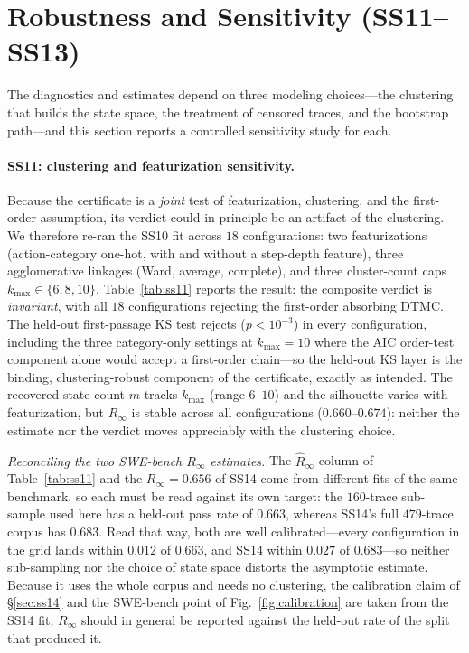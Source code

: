 \section{Robustness and Sensitivity (SS11--SS13)}
\label{sec:robustness}

The diagnostics and estimates depend on three modeling choices---the
clustering that builds the state space, the treatment of censored traces, and
the bootstrap path---and this section reports a controlled sensitivity study
for each.

\paragraph{SS11: clustering and featurization sensitivity.}
Because the certificate is a \emph{joint} test of featurization, clustering,
and the first-order assumption, its verdict could in principle be an artifact
of the clustering. We therefore re-ran the SS10 fit across $18$
configurations: two featurizations (action-category one-hot, with and without
a step-depth feature), three agglomerative linkages (Ward, average, complete),
and three cluster-count caps $k_{\max}\in\{6,8,10\}$. Table~\ref{tab:ss11}
reports the result: the composite verdict is \emph{invariant}, with all $18$
configurations rejecting the first-order absorbing DTMC. The held-out
first-passage KS test rejects ($p<10^{-3}$) in every configuration, including
the three category-only settings at $k_{\max}{=}10$ where the AIC order-test
component alone would accept a first-order chain---so the held-out KS layer is
the binding, clustering-robust component of the certificate, exactly as
intended. The recovered state count $m$ tracks $k_{\max}$ (range $6$--$10$) and
the silhouette varies with featurization, but $\hat R_\infty$ is stable across
all configurations ($0.660$--$0.674$): neither the estimate nor the verdict
moves appreciably with the clustering choice.

\emph{Reconciling the two SWE-bench $R_\infty$ estimates.} The
$\hat R_\infty$ column of Table~\ref{tab:ss11} and the $R_\infty=0.656$ of
SS14 come from different fits of the same benchmark, so each must be read
against its own target: the $160$-trace sub-sample used here has a held-out
pass rate of $0.663$, whereas SS14's full $479$-trace corpus has $0.683$. Read
that way, both are well calibrated---every configuration in the grid lands
within $0.012$ of $0.663$, and SS14 within $0.027$ of $0.683$---so neither
sub-sampling nor the choice of state space distorts the asymptotic estimate.
Because it uses the whole corpus and needs no clustering, the calibration claim
of \S\ref{sec:ss14} and the SWE-bench point of Fig.~\ref{fig:calibration} are
taken from the SS14 fit; $R_\infty$ should in general be reported against the
held-out rate of the split that produced it.

